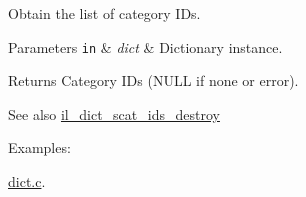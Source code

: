 Obtain the list of category I\+Ds. 


\begin{DoxyParams}[1]{Parameters}
\mbox{\tt in}  & {\em dict} & Dictionary instance.\\
\hline
\end{DoxyParams}
\begin{DoxyReturn}{Returns}
Category I\+Ds (N\+U\+LL if none or error).
\end{DoxyReturn}
\begin{DoxySeeAlso}{See also}
\hyperlink{group__IL__DICT_gaa558e902f07600780b351f9e58f443df}{il\+\_\+dict\+\_\+scat\+\_\+ids\+\_\+destroy} 
\end{DoxySeeAlso}
\begin{Desc}
\item[Examples\+: ]\par
\hyperlink{dict_8c-example}{dict.\+c}.\end{Desc}

